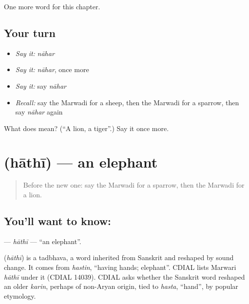 \begin{grammarlens}[title={What you've built}]
One more word for this chapter.
\end{grammarlens}

\subsection*{Your turn}
\begin{itemize}
\raggedright
  \item \emph{Say it:} \emph{nāhar}
  \item \emph{Say it:} \emph{nāhar}, once more
  \item \emph{Say it:} say \emph{nāhar}
  \item \emph{Recall:} say the Marwadi for a sheep, then the Marwadi for a sparrow, then say \emph{nāhar} again
\end{itemize}

\begin{tcolorbox}[breakable,colback=teal!4,colframe=teal!35!black,title={Before you move on}]
What does  mean? (\textquotedblleft{}A lion, a tiger\textquotedblright{}.) Say it once more.
\end{tcolorbox}
\section[\texorpdfstring{\mw{हाथी} (hāthī)}{हाथी (hāthī)}]{ (hāthī) — an elephant}

\label{lesson:MW-C71-hathi}



\begin{quote}
Before the new one: say the Marwadi for a sparrow, then the Marwadi for a lion.
\end{quote}

\subsection*{You'll want to know: }
\textbf{} — \emph{hāthī} — \textquotedblleft{}an elephant\textquotedblright{}.

\begin{cousinweb}
\textbf{} (\emph{hāthī}) is a tadbhava, a word inherited from Sanskrit and reshaped by sound change. It comes from \emph{hastin}, \textquotedblleft{}having hands; elephant\textquotedblright{}. CDIAL lists Marwari \emph{hāthī} under it (CDIAL 14039). CDIAL asks whether the Sanskrit word reshaped an older \emph{karin}, perhaps of non-Aryan origin, tied to \emph{hasta}, \textquotedblleft{}hand\textquotedblright{}, by popular etymology.
\end{cousinweb}

